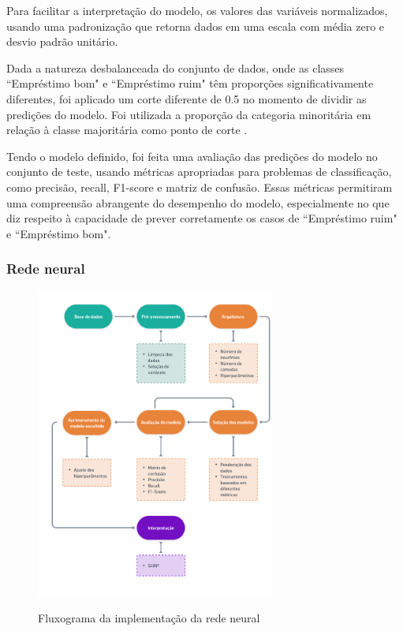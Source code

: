 Para facilitar a interpretação do modelo, os valores das variáveis
 normalizados, usando uma padronização que retorna dados em uma escala com média zero e
desvio padrão unitário.

Dada a natureza desbalanceada do conjunto de dados, onde as classes ``Empréstimo bom" e ``Empréstimo ruim" têm
proporções significativamente diferentes, foi aplicado um corte diferente de 0.5 no momento de dividir as predições
do modelo. Foi utilizada a proporção da categoria minoritária em relação à classe majoritária como ponto de corte
\cite{agresti2002}.

Tendo o modelo definido, foi feita uma avaliação das predições do modelo no conjunto de teste, usando métricas
apropriadas para problemas de classificação, como precisão, recall, F1-score e matriz de confusão. 
Essas métricas permitiram uma compreensão abrangente do desempenho do modelo, especialmente no que diz respeito à
capacidade de prever corretamente os casos de ``Empréstimo ruim" e ``Empréstimo bom".


\subsubsection{Rede neural}

\begin{figure}[H]
  \caption{Fluxograma da implementação da rede neural}
  \centering
  \includegraphics[width=0.7\textwidth]{imagens/flugrama_rede_neural.png}
  \label{fig:imagens/flugrama_rede_neural.png}
\end{figure}



